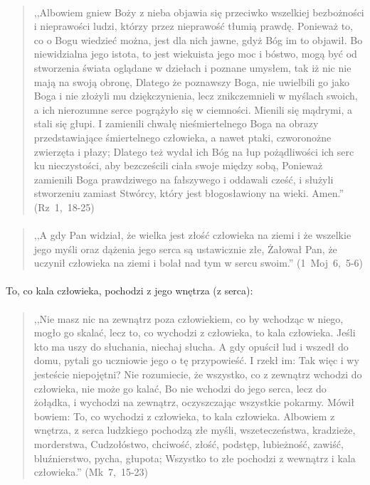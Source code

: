 \documentclass[10pt,a4paper,oneside]{article}
\begin{document}
\paragraph{}
\begin{quote}
,,Albowiem gniew Boży z nieba objawia się przeciwko wszelkiej bezbożności i nieprawości ludzi, którzy przez nieprawość tłumią prawdę. Ponieważ to, co o Bogu wiedzieć można, jest dla nich jawne, gdyż Bóg im to objawił. Bo niewidzialna jego istota, to jest wiekuista jego moc i bóstwo, mogą być od stworzenia świata oglądane w dziełach i poznane umysłem, tak iż nic nie mają na swoją obronę, Dlatego że poznawszy Boga, nie uwielbili go jako Boga i nie złożyli mu dziękczynienia, lecz znikczemnieli w myślach swoich, a ich nierozumne serce pogrążyło się w ciemności. Mienili się mądrymi, a stali się głupi. I zamienili chwałę nieśmiertelnego Boga na obrazy przedstawiające śmiertelnego człowieka, a nawet ptaki, czworonożne zwierzęta i płazy; Dlatego też wydał ich Bóg na łup pożądliwości ich serc ku nieczystości, aby bezcześcili ciała swoje między sobą, Ponieważ zamienili Boga prawdziwego na fałszywego i oddawali cześć, i służyli stworzeniu zamiast Stwórcy, który jest błogosławiony na wieki. Amen.'' \mbox{(Rz 1, 18-25)}
\end{quote}
\paragraph{}
\begin{quote}
,,A gdy Pan widział, że wielka jest złość człowieka na ziemi i że wszelkie jego myśli oraz dążenia jego serca są ustawicznie złe, Żałował Pan, że uczynił człowieka na ziemi i bolał nad tym w sercu swoim.'' \mbox{(1 Moj 6, 5-6)}
\end{quote}
\paragraph{}
To, co kala człowieka, pochodzi z jego wnętrza (z serca):
\paragraph{}
\begin{quote}
,,Nie masz nic na zewnątrz poza człowiekiem, co by wchodząc w niego, mogło go skalać, lecz to, co wychodzi z człowieka, to kala człowieka. Jeśli kto ma uszy do słuchania, niechaj słucha. A gdy opuścił lud i wszedł do domu, pytali go uczniowie jego o tę przypowieść. I rzekł im: Tak więc i wy jesteście niepojętni? Nie rozumiecie, że wszystko, co z zewnątrz wchodzi do człowieka, nie może go kalać, Bo nie wchodzi do jego serca, lecz do żołądka, i wychodzi na zewnątrz, oczyszczając wszystkie pokarmy. Mówił bowiem: To, co wychodzi z człowieka, to kala człowieka. Albowiem z wnętrza, z serca ludzkiego pochodzą złe myśli, wszeteczeństwa, kradzieże, morderstwa, Cudzołóstwo, chciwość, złość, podstęp, lubieżność, zawiść, bluźnierstwo, pycha, głupota; Wszystko to złe pochodzi z wewnątrz i kala człowieka.'' \mbox{(Mk 7, 15-23)}
\end{quote}
\end{document}
